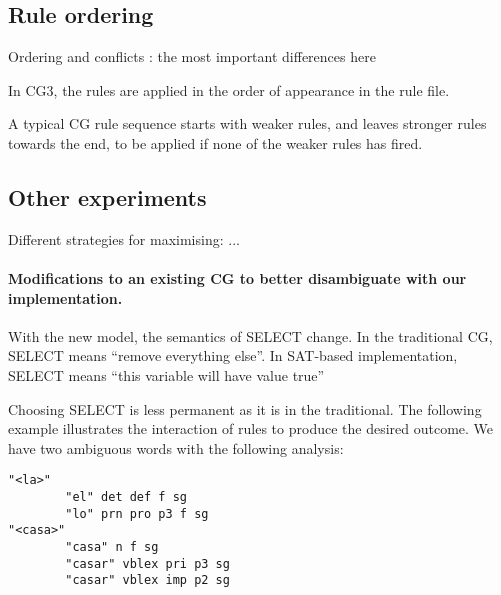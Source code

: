 \documentclass[11pt]{article}
\begin{document}
\subsection{Rule ordering}
\label{ssec:ordering}

Ordering and conflicts : the most important differences here



In CG3, the rules are applied in the order of appearance in the rule file.

A typical CG rule sequence starts with weaker rules, and leaves stronger rules towards the end, 
to be applied if none of the weaker rules has fired.

\subsection{Other experiments}

Different strategies for maximising: ...

\paragraph{Modifications to an existing CG to better disambiguate with our implementation.}
With the new model, the semantics of SELECT change.
In the traditional CG, SELECT means ``remove everything else''. 
In SAT-based implementation, SELECT means ``this variable will have value true'' 


Choosing SELECT is less permanent as it is in the traditional. The following example illustrates the interaction of rules to produce the desired outcome. We have two ambiguous words with the following analysis:

\begin{verbatim}
"<la>"
        "el" det def f sg
        "lo" prn pro p3 f sg
"<casa>"
        "casa" n f sg
        "casar" vblex pri p3 sg
        "casar" vblex imp p2 sg
\end{verbatim}
\end{document}
